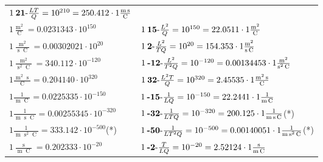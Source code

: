 \begin{center}
\begin{longtable}{l l}
	{\color{black}$1\:\text{\textbf{21}-} \frac{LT}{Q}=10^{210} = 250.412 \cdot 1 \bm{\mathrm{ }}\frac{\operatorname{m}\operatorname{s}}{\operatorname{C}}$}\\
{\color{black}$1 \bm{\mathrm{ }}\frac{\operatorname{m}^2}{\operatorname{C}} = 0.0231343\cdot10^{150} $}&
	{\color{black}$1\:\text{\textbf{15}-} \frac{L^2}{Q}=10^{150} = 22.0511 \cdot 1 \bm{\mathrm{ }}\frac{\operatorname{m}^2}{\operatorname{C}}$}\\
{\color{black}$1 \bm{\mathrm{ }}\frac{\operatorname{m}^2}{\operatorname{s}\operatorname{C}} = 0.00302021\cdot10^{20} $}&
	{\color{black}$1\:\text{\textbf{2}-} \frac{L^2}{TQ}=10^{20} = 154.353 \cdot 1 \bm{\mathrm{ }}\frac{\operatorname{m}^2}{\operatorname{s}\operatorname{C}}$}\\
{\color{black}$1 \bm{\mathrm{ }}\frac{\operatorname{m}^2}{\operatorname{s}^2\operatorname{C}} = 340.112\cdot10^{-120} $}&
	{\color{black}$1\:\text{\textbf{-12}-} \frac{L^2}{T^2Q}=10^{-120} = 0.00134453 \cdot 1 \bm{\mathrm{ }}\frac{\operatorname{m}^2}{\operatorname{s}^2\operatorname{C}}$}\\
{\color{black}$1 \bm{\mathrm{ }}\frac{\operatorname{m}^2\operatorname{s}}{\operatorname{C}} = 0.204140\cdot10^{320} $}&
	{\color{black}$1\:\text{\textbf{32}-} \frac{L^2T}{Q}=10^{320} = 2.45535 \cdot 1 \bm{\mathrm{ }}\frac{\operatorname{m}^2\operatorname{s}}{\operatorname{C}}$}\\
{\color{black}$1 \bm{\mathrm{ }}\frac1{\operatorname{m}\operatorname{C}} = 0.0225335\cdot10^{-150} $}&
	{\color{black}$1\:\text{\textbf{-15}-} \frac1{LQ}=10^{-150} = 22.2441 \cdot 1 \bm{\mathrm{ }}\frac1{\operatorname{m}\operatorname{C}}$}\\
{\color{black}$1 \bm{\mathrm{ }}\frac1{\operatorname{m}\operatorname{s}\operatorname{C}} = 0.00255345\cdot10^{-320} $}&
	{\color{black}$1\:\text{\textbf{-32}-} \frac1{LTQ}=10^{-320} = 200.125 \cdot 1 \bm{\mathrm{ }}\frac1{\operatorname{m}\operatorname{s}\operatorname{C}}$}\quad(*)\\
{\color{black}$1 \bm{\mathrm{ }}\frac1{\operatorname{m}\operatorname{s}^2\operatorname{C}} = 333.142\cdot10^{-500} $}\quad(*)&
	{\color{black}$1\:\text{\textbf{-50}-} \frac1{LT^2Q}=10^{-500} = 0.00140051 \cdot 1 \bm{\mathrm{ }}\frac1{\operatorname{m}\operatorname{s}^2\operatorname{C}}$}\quad(*)\\
{\color{black}$1 \bm{\mathrm{ }}\frac{\operatorname{s}}{\operatorname{m}\operatorname{C}} = 0.202333\cdot10^{-20} $}&
	{\color{black}$1\:\text{\textbf{-2}-} \frac{T}{LQ}=10^{-20} = 2.52124 \cdot 1 \bm{\mathrm{ }}\frac{\operatorname{s}}{\operatorname{m}\operatorname{C}}$}\\

\end{longtable}
\end{center}
